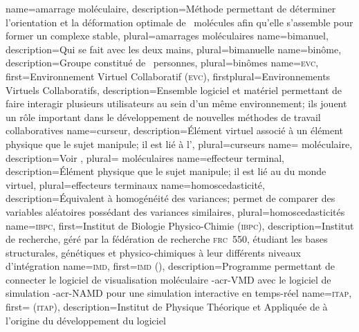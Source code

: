 %
{%
	name={amarrage moléculaire},%
	description={Méthode permettant de déterminer l'orientation et la déformation optimale de ~molécules afin qu'elle s'assemble pour former un complexe stable},%
	plural={amarrages moléculaires}%
}
%
{%
	name={bimanuel},%
	description={Qui se fait avec les deux mains},%
	plural={bimanuelle}%
}
%
{%
	name={binôme},%
	description={Groupe constitué de ~personnes},%
	plural={binômes}%
}
%
{%
	name={\textsc{evc}},%
	first={Environnement Virtuel Collaboratif (\textsc{evc})},%
	firstplural={Environnements Virtuels Collaboratifs},%
	description={Ensemble logiciel et matériel permettant de faire interagir plusieurs utilisateurs au sein d'un même environnement; ils jouent un rôle important dans le développement de nouvelles méthodes de travail collaboratives}%
}
%
{%
	name={curseur},%
	description={Élément virtuel associé à un élément physique que le sujet manipule; il est lié à l'},%
	plural={curseurs}%
}
%
{%
	name={ moléculaire},%
	description={Voir },%
	plural={ moléculaires}%
}
%
{%
	name={effecteur terminal},%
	description={Élément physique que le sujet manipule; il est lié au  du monde virtuel},%
	plural={effecteurs terminaux}%
}
%
{%
	name={homoscedasticité},%
	description={Équivalent à homogénéité des variances; permet de comparer des variables aléatoires possédant des variances similaires},%
	plural={homoscedasticités}%
}
%
{%
	name={\textsc{ibpc}},%
	first={Institut de Biologie Physico-Chimie (\textsc{ibpc})},%
	description={Institut de recherche, géré par la fédération de recherche \textsc{frc}~550, étudiant les bases structurales, génétiques et physico-chimiques à leur différents niveaux d'intégration}%
}
%
{%
	name={\textsc{imd}},%
	first={\textsc{imd} ()},%
	description={Programme permettant de connecter le logiciel de visualisation moléculaire \myacro-{acr-VMD} avec le logiciel de simulation \myacro-{acr-NAMD} pour une simulation interactive en temps-réel }%
}
%
{%
	name={\textsc{itap}},%
	first={ (\textsc{itap})},%
	description={Institut de Physique Théorique et Appliquée de  à l'origine du développement du logiciel }%
}
